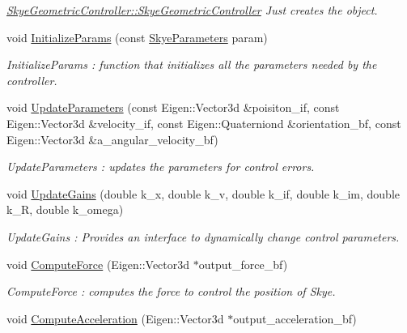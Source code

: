 \begin{DoxyCompactItemize}
\begin{DoxyCompactList}\small\item\em \hyperlink{class_skye_geometric_controller_a40739735f7c55b861647ecad873080ac}{Skye\-Geometric\-Controller\-::\-Skye\-Geometric\-Controller} Just creates the object. \end{DoxyCompactList}\item 
void \hyperlink{class_skye_geometric_controller_a78773edf4b0a80b1e26daec62b17a42a}{Initialize\-Params} (const \hyperlink{struct_skye_parameters}{Skye\-Parameters} param)
\begin{DoxyCompactList}\small\item\em Initialize\-Params \-: function that initializes all the parameters needed by the controller. \end{DoxyCompactList}\item 
void \hyperlink{class_skye_geometric_controller_a59e2b48fa22a5910cf932cd8217ae062}{Update\-Parameters} (const Eigen\-::\-Vector3d \&poisiton\-\_\-if, const Eigen\-::\-Vector3d \&velocity\-\_\-if, const Eigen\-::\-Quaterniond \&orientation\-\_\-bf, const Eigen\-::\-Vector3d \&a\-\_\-angular\-\_\-velocity\-\_\-bf)
\begin{DoxyCompactList}\small\item\em Update\-Parameters \-: updates the parameters for control errors. \end{DoxyCompactList}\item 
void \hyperlink{class_skye_geometric_controller_a86e1970fa9f94b0a1d09b7368ee19bf8}{Update\-Gains} (double k\-\_\-x, double k\-\_\-v, double k\-\_\-if, double k\-\_\-im, double k\-\_\-\-R, double k\-\_\-omega)
\begin{DoxyCompactList}\small\item\em Update\-Gains \-: Provides an interface to dynamically change control parameters. \end{DoxyCompactList}\item 
void \hyperlink{class_skye_geometric_controller_afe9b74936a7118f7185113db56954f73}{Compute\-Force} (Eigen\-::\-Vector3d $\ast$output\-\_\-force\-\_\-bf)
\begin{DoxyCompactList}\small\item\em Compute\-Force \-: computes the force to control the position of Skye. \end{DoxyCompactList}\item 
void \hyperlink{class_skye_geometric_controller_ab2676ca5ec54b90946bd2707abc39872}{Compute\-Acceleration} (Eigen\-::\-Vector3d $\ast$output\-\_\-acceleration\-\_\-bf)

\end{DoxyCompactItemize}
